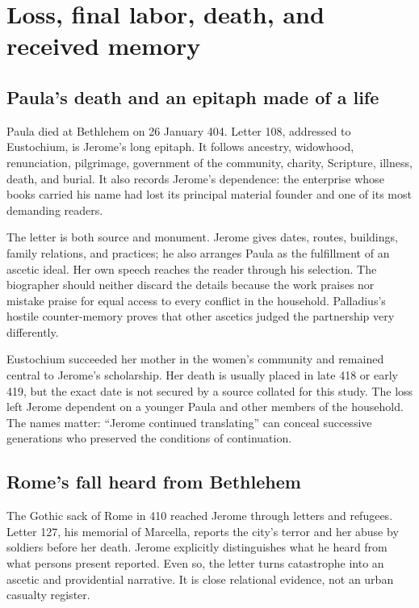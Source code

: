 \section{Loss, final labor, death, and received memory}\label{sec:jerome-death}

\subsection{Paula's death and an epitaph made of a life}

Paula died at Bethlehem on 26 January 404. Letter 108, addressed to Eustochium,
is Jerome's long epitaph. It follows ancestry, widowhood, renunciation,
pilgrimage, government of the community, charity, Scripture, illness, death,
and burial. It also records Jerome's dependence: the enterprise whose books
carried his name had lost its principal material founder and one of its most
demanding readers.

The letter is both source and monument. Jerome gives dates, routes, buildings,
family relations, and practices; he also arranges Paula as the fulfillment of
an ascetic ideal. Her own speech reaches the reader through his selection. The
biographer should neither discard the details because the work praises nor
mistake praise for equal access to every conflict in the household. Palladius's
hostile counter-memory proves that other ascetics judged the partnership very
differently.

Eustochium succeeded her mother in the women's community and remained central
to Jerome's scholarship. Her death is usually placed in late 418 or early 419,
but the exact date is not secured by a source collated for this study. The loss
left Jerome dependent on a younger Paula and other members of the household.
The names matter: ``Jerome continued translating'' can conceal successive
generations who preserved the conditions of continuation.

\subsection{Rome's fall heard from Bethlehem}

The Gothic sack of Rome in 410 reached Jerome through letters and refugees.
Letter 127, his memorial of Marcella, reports the city's terror and her abuse by
soldiers before her death. Jerome explicitly distinguishes what he heard from
what persons present reported. Even so, the letter turns catastrophe into an
ascetic and providential narrative. It is close relational evidence, not an
urban casualty register.

